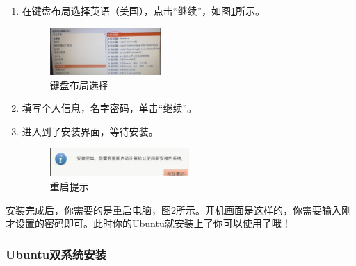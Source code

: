 \documentclass{article}
\begin{document}
\begin{enumerate}
\item  在键盘布局选择英语（美国），点击“继续”，如图\ref{tu13}所示。
\begin{figure}[!htb] %
\centering
\includegraphics[width=0.4\textwidth]{tu13.jpeg}
\caption{\small 键盘布局选择}
\label{tu13}
\end{figure} 

\item  填写个人信息，名字密码，单击“继续”。

\item  进入到了安装界面，等待安装。

\begin{figure}[!htb] %
\centering
\includegraphics[width=0.5\textwidth]{tu14.jpeg}
\caption{\small 重启提示}
\label{tu14}
\end{figure} 
\end{enumerate}
安装完成后，你需要的是重启电脑，图\ref{tu14}所示。开机画面是这样的，你需要输入刚才设置的密码即可。此时你的Ubuntu就安装上了你可以使用了哦！

\subsubsection{Ubuntu双系统安装}
\end{document}
